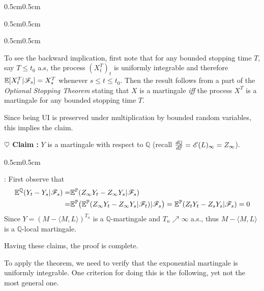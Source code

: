 \documentclass[12pt,a4paper]{article}
\newenvironment{proof}
{\begin{changemargin}{0.5cm}{0.5cm} 
	}%
	{\end{changemargin}
}
\newenvironment{subproof}
{\begin{changemargin}{0.5cm}{0.5cm} 
	}%
	{\end{changemargin}
}
\newenvironment{p}
{\begin{proof} 
	}%
	{\end{proof}
}
\begin{document}
\begin{p}
\begin{subproof}
\begin{subproof}
\quad To see the backward implication, first note that for any bounded stopping time $T$, say $T\leq t_0$ a.s, the process $(X^T_t)_t$ is uniformly integrable and therefore $\mathbb{E}[X^T_t | \mathscr{F}_s] = X^T_s$ whenever $s\leq t\leq t_0$. Then the result follows from a part of the \emph{Optional Stopping Theorem} stating that $X$ is a martingale \emph{iff} the process $X^T$ is a martingale for any bounded stopping time $T$.
\end{subproof}
Since being UI is preserved under multiplication by bounded random variables, this implies the claim.
\end{subproof}

\textbf{$\heartsuit$ Claim :} $Y$ is a martingale with respect to $\mathbb{Q}$ (recall $\frac{d \mathbb{Q}}{d \mathbb{P}} = \mathscr{E} (L)_{\infty} = Z_{\infty}$).
\begin{subproof}
: First observe that
\begin{align*}
\mathbb{E}^{\mathbb{Q}}(Y_t - Y_s | \mathscr{F}_s) =& \mathbb{E}^{\mathbb{P}}(Z_{\infty}Y_t - Z_{\infty} Y_s |\mathscr{F}_s ) \\
=& \mathbb{E}^{\mathbb{P}}\big( \mathbb{E}^{\mathbb{P}}(Z_{\infty}Y_t - Z_{\infty} Y_s |\mathscr{F}_t ) | \mathscr{F}_s \big) = \mathbb{E}^{\mathbb{P}} (Z_t Y_t - Z_s Y_s | \mathscr{F}_s) =0
\end{align*}
Since $Y = (M - \langle M, L \rangle)^{T_n}$ is a $\mathbb{Q}$-martingale and $T_n \nearrow \infty$ a.s., thus $M - \langle M, L \rangle$ is a $\mathbb{Q}$-local martingale.
\end{subproof}
Having these claims, the proof is complete.

\eop
\end{p}
\s

To apply the theorem, we need to verify that the exponential martingale is uniformly integrable. One criterion for doing this is the following, yet not the most general one.
\s
\end{document}
